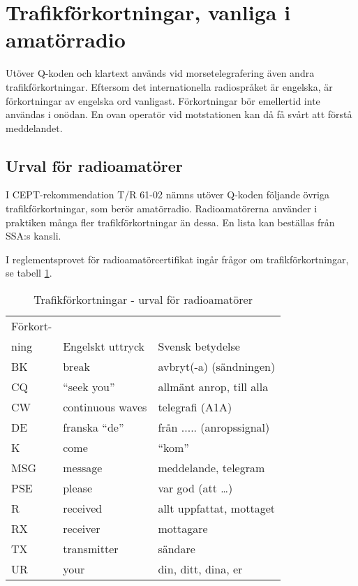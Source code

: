 \section{Trafikförkortningar, vanliga i amatörradio}

Utöver Q-koden och klartext används vid morsetelegrafering även andra
trafikförkortningar. Eftersom det internationella radiospråket är
engelska, är förkortningar av engelska ord vanligast.  Förkortningar
bör emellertid inte användas i onödan. En ovan operatör vid
motstationen kan då få svårt att förstå meddelandet.

\subsection{Urval för radioamatörer}

I CEPT-rekommendation T/R 61-02 nämns utöver Q-koden följande övriga
trafikförkortningar, som berör amatörradio.  Radioamatörerna använder
i praktiken många fler trafikförkortningar än dessa. En lista kan
beställas från SSA:s kansli.

I reglementsprovet för radioamatörcertifikat ingår frågor om
trafikförkortningar, se tabell \ref{tab:trafikförkortningar}.

\begin{table}
  \label{tab:trafikförkortningar}
  \caption{Trafikförkortningar - urval för radioamatörer}
  \begin{tabular}{lll}
    Förkort- & & \\
    ning & Engelskt uttryck & Svensk betydelse \\
    \hline
    BK & break & avbryt(-a) (sändningen) \\
    CQ & ``seek you'' & allmänt anrop, till alla \\
    CW & continuous waves & telegrafi (A1A) \\
    DE & franska ``de'' & från ..... (anropssignal) \\
    K  & come & ``kom'' \\
    MSG & message & meddelande, telegram \\
    PSE & please & var god (att \dots) \\
    R & received & allt uppfattat, mottaget \\
    RX & receiver & mottagare \\
    TX & transmitter & sändare \\
    UR & your & din, ditt, dina, er \\
  \end{tabular}
\end{table}

